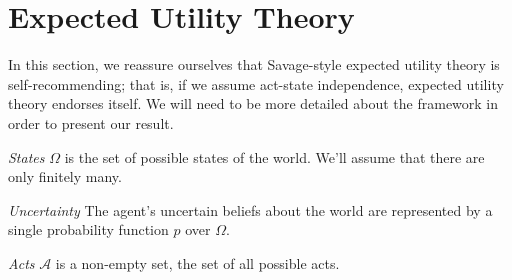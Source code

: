 \documentclass[a4paper]{article}
\newcommand\A{\mathcal{A}}
\newenvironment{CCM rewritten}
{\begingroup\color{blue}} %
{\endgroup}              %
\begin{document}




\section{Expected Utility Theory}\label{sect:eut}
In this section, we reassure ourselves that Savage-style expected utility theory is self-recommending; that is, if we assume act-state independence, expected utility theory endorses itself. We will need to be more detailed about the framework in order to present our result. 


 \emph{States } $\Omega$ is the set of possible states of the world. We'll assume that there are only finitely many.

\emph{Uncertainty } The agent's uncertain beliefs about the world are represented by a single probability function $p$ over $\Omega$. 

\emph{Acts }
$\A$ is a non-empty set, the set of all possible acts. 
\end{document}

